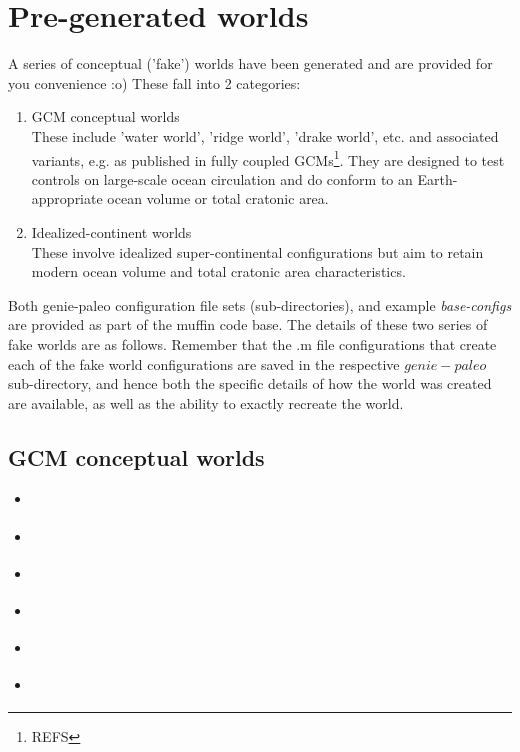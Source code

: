 \documentclass[11pt,fleqn]{book} %
\begin{document}

\newpage

\section{Pre-generated worlds}

A series of conceptual ('fake') worlds have been generated and are provided for you convenience :o) These fall into 2 categories:

\begin{enumerate}[noitemsep]
\vspace{1mm}
\item GCM conceptual worlds
\\These include 'water world', 'ridge world', 'drake world', etc. and associated variants, e.g. as published in fully coupled GCMs\footnote{REFS}. They are designed to test controls on large-scale ocean circulation and do conform to an Earth-appropriate ocean volume or total cratonic area.  
\vspace{1mm}
\item Idealized-continent worlds
\\These involve idealized super-continental configurations but aim to retain modern ocean volume and total cratonic area characteristics.
\end{enumerate}
\vspace{1mm}

Both \textsf{\footnotesize genie-paleo} configuration file sets (sub-directories), and example \textit{base-configs} are provided as part of the muffin code base. The details of these two series of fake worlds are as follows. Remember that the \textsf{\footnotesize .m} file configurations that create each of the fake world configurations are saved in the respective \(genie-paleo\) sub-directory, and hence both the specific details of how the world was created are available, as well as the ability to exactly recreate the world. 

%
\subsection{GCM conceptual worlds}

\small\begin{itemize}[noitemsep]
\vspace{1mm}
\item \textsf{\footnotesize } 
\item \textsf{\footnotesize } 
\item \textsf{\footnotesize } 
\item \textsf{\footnotesize } 
\item \textsf{\footnotesize } 
\item \textsf{\footnotesize } 
\end{itemize}\normalsize
\vspace{1mm}
\end{document}
